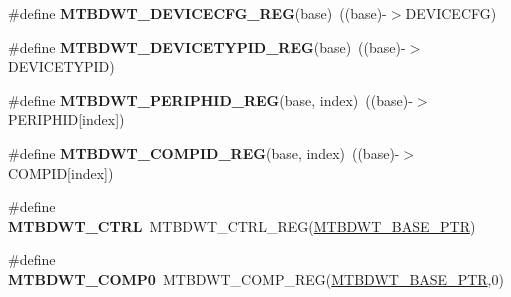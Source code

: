 \begin{DoxyCompactItemize}
\mbox{\label{group___m_t_b_d_w_t___register___accessor___macros_ga918d93e20e19d7e33c59ebd700dc5f74}} 
\#define {\bfseries M\+T\+B\+D\+W\+T\+\_\+\+D\+E\+V\+I\+C\+E\+C\+F\+G\+\_\+\+R\+EG}(base)~((base)-\/$>$D\+E\+V\+I\+C\+E\+C\+FG)
\item 
\mbox{\label{group___m_t_b_d_w_t___register___accessor___macros_gae85feea5348b4fe3e3084e1a58b556fd}} 
\#define {\bfseries M\+T\+B\+D\+W\+T\+\_\+\+D\+E\+V\+I\+C\+E\+T\+Y\+P\+I\+D\+\_\+\+R\+EG}(base)~((base)-\/$>$D\+E\+V\+I\+C\+E\+T\+Y\+P\+ID)
\item 
\mbox{\label{group___m_t_b_d_w_t___register___accessor___macros_ga91f7c6dfb35fc0d26fb6b3fae63757fc}} 
\#define {\bfseries M\+T\+B\+D\+W\+T\+\_\+\+P\+E\+R\+I\+P\+H\+I\+D\+\_\+\+R\+EG}(base,  index)~((base)-\/$>$P\+E\+R\+I\+P\+H\+ID\mbox{[}index\mbox{]})
\item 
\mbox{\label{group___m_t_b_d_w_t___register___accessor___macros_gaaeee0c6c32b2caddaf8ec3a96b430de0}} 
\#define {\bfseries M\+T\+B\+D\+W\+T\+\_\+\+C\+O\+M\+P\+I\+D\+\_\+\+R\+EG}(base,  index)~((base)-\/$>$C\+O\+M\+P\+ID\mbox{[}index\mbox{]})
\item 
\mbox{\label{group___m_t_b_d_w_t___register___accessor___macros_gadb4142d6299394f942ea20e3b6fae17b}} 
\#define {\bfseries M\+T\+B\+D\+W\+T\+\_\+\+C\+T\+RL}~M\+T\+B\+D\+W\+T\+\_\+\+C\+T\+R\+L\+\_\+\+R\+EG(\hyperlink{group___m_t_b_d_w_t___peripheral_ga97d048bfb5a11293a38c444b8347ff42}{M\+T\+B\+D\+W\+T\+\_\+\+B\+A\+S\+E\+\_\+\+P\+TR})
\item 
\mbox{\label{group___m_t_b_d_w_t___register___accessor___macros_ga8d2e850737820e0876358db17f0bd37d}} 
\#define {\bfseries M\+T\+B\+D\+W\+T\+\_\+\+C\+O\+M\+P0}~M\+T\+B\+D\+W\+T\+\_\+\+C\+O\+M\+P\+\_\+\+R\+EG(\hyperlink{group___m_t_b_d_w_t___peripheral_ga97d048bfb5a11293a38c444b8347ff42}{M\+T\+B\+D\+W\+T\+\_\+\+B\+A\+S\+E\+\_\+\+P\+TR},0)
\item 
\mbox{\label{group___m_t_b_d_w_t___register___accessor___macros_ga67bf35c31a64cd369ef04e88e3c10a18}} 

\end{DoxyCompactItemize}
